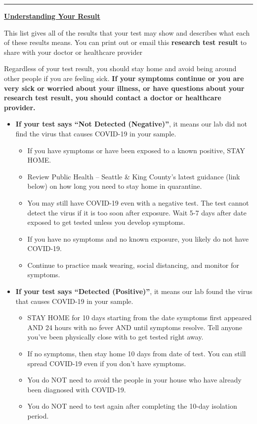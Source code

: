 \documentclass[10pt]{article}
\newcommand{\PageLine}{\rule{\textwidth}{0.25mm}}
\begin{document}
\PageLine
\bigskip

\large \underline{\textbf{Understanding Your Result}}

This list gives all of the results that your test may show and describes what
each of these results means. You can print out or email this \textbf{research
test result} to share with your doctor or healthcare provider

Regardless of your test result, you should stay home and avoid being around
other people if you are feeling sick. \textbf{If your symptoms continue or you are
very sick or worried about your illness, or have questions about your research
test result, you should contact a doctor or healthcare provider.}

\begin{itemize}


\item

  \textbf{If your test says ``Not Detected (Negative)''}, it means our lab did not find the
  virus that causes COVID-19 in your sample.

  \begin{itemize}
    \item
      If you have symptoms or have been exposed to a known positive, STAY HOME.
    \item
      Review Public Health – Seattle \& King County’s latest guidance (link below) on how long you need to stay home in quarantine.
    \item
      You may still have COVID-19 even with a negative test. The test cannot detect the virus if it is too soon after exposure.
      Wait 5-7 days after date exposed to get tested unless you develop symptoms.
    \item
      If you have no symptoms and no known exposure, you likely do not have COVID-19.
    \item
      Continue to practice mask wearing, social distancing, and monitor for symptoms.
  \end{itemize}

\item

  \textbf{If your test says ``Detected (Positive)''}, it means our
  lab found the virus that causes COVID-19 in your sample.

  \begin{itemize}
    \item STAY HOME for 10 days starting from the date symptoms first appeared AND 24 hours with no fever AND until symptoms resolve. Tell anyone you’ve been physically close with to get tested right away.
    \item If no symptoms, then stay home 10 days from date of test. You can still spread COVID-19 even if you don’t have symptoms.
    \item You do NOT need to avoid the people in your house who have already been diagnosed with COVID-19.
    \item You do NOT need to test again after completing the 10-day isolation period.
  \end{itemize}


\end{itemize}
\end{document}
